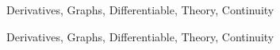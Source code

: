 \begin{tagblock}{Derivatives, Graphs, Differentiable, Theory, Continuity}
\begin{question}
\begin{enumerate}
\end{enumerate}













	









	
	
\begin{tags}
	    Derivatives, Graphs, Differentiable, Theory, Continuity
\end{tags}
	
\begin{diary}
\end{diary}
	
\begin{solution}
	   
\end{solution}
	
\end{question}

\end{tagblock}


